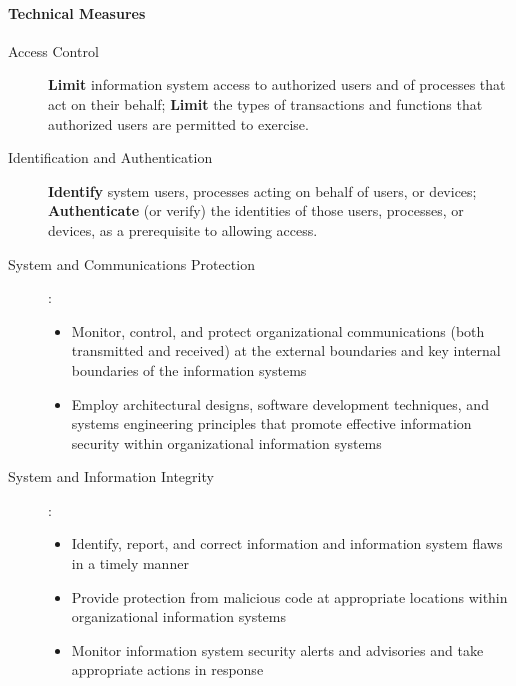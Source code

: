 \documentclass{article}
\begin{document}
                \paragraph{Technical Measures}
                        \begin{description}
                            \item[Access Control] \textbf{Limit} information system access to authorized users and of processes that act on their behalf; \textbf{Limit} the types of transactions and functions that authorized users are permitted to exercise. 
                            \item[Identification and Authentication] \textbf{Identify} system users, processes acting on behalf of users, or devices; \textbf{Authenticate} (or verify) the identities of those users, processes, or devices, as a prerequisite to allowing access.
                            
                            \item[System and Communications Protection]: 
                            
                            \begin{itemize}
                                \item Monitor, control, and protect organizational communications (both transmitted and received) at the external boundaries and key internal boundaries of the information systems
                                \item Employ architectural designs, software development techniques, and systems engineering principles that promote effective information security within organizational information systems
                            \end{itemize}
                            \item [System and Information Integrity]:
                             
                            \begin{itemize}
                                \item Identify, report, and correct information and information system flaws in a timely manner
                                \item Provide protection from malicious code at appropriate locations within organizational information systems
                                \item Monitor information system security alerts and advisories and take appropriate actions in response
                            \end{itemize}
                            
                        \end{description}
\end{document}
